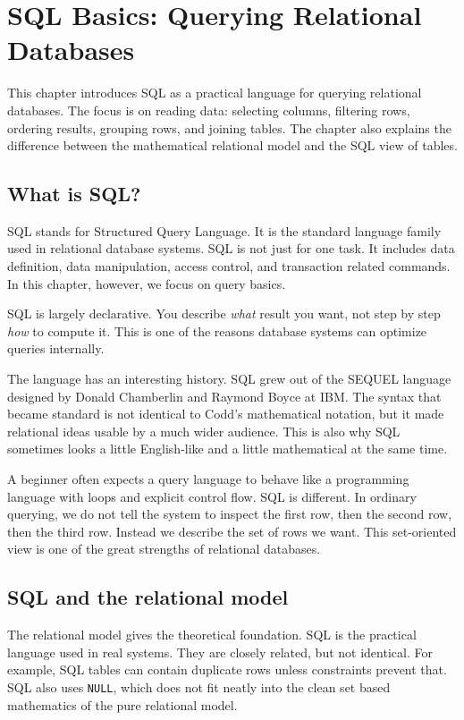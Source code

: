 \documentclass[11pt,a4paper,openany]{book}
\begin{document}
\chapter{SQL Basics: Querying Relational Databases}
\label{ch:sqlbasic}
\begin{guidancebox}
This chapter introduces SQL as a practical language for querying relational databases. The focus is on reading data: selecting columns, filtering rows, ordering results, grouping rows, and joining tables. The chapter also explains the difference between the mathematical relational model and the SQL view of tables.
\end{guidancebox}

\section{What is SQL?}
SQL stands for Structured Query Language. It is the standard language family used in relational database systems. SQL is not just for one task. It includes data definition, data manipulation, access control, and transaction related commands. In this chapter, however, we focus on query basics.

SQL is largely declarative. You describe \emph{what} result you want, not step by step \emph{how} to compute it. This is one of the reasons database systems can optimize queries internally.

The language has an interesting history. SQL grew out of the SEQUEL language designed by Donald Chamberlin and Raymond Boyce at IBM. The syntax that became standard is not identical to Codd's mathematical notation, but it made relational ideas usable by a much wider audience. This is also why SQL sometimes looks a little English-like and a little mathematical at the same time.

A beginner often expects a query language to behave like a programming language with loops and explicit control flow. SQL is different. In ordinary querying, we do not tell the system to inspect the first row, then the second row, then the third row. Instead we describe the set of rows we want. This set-oriented view is one of the great strengths of relational databases.

\section{SQL and the relational model}
The relational model gives the theoretical foundation. SQL is the practical language used in real systems. They are closely related, but not identical. For example, SQL tables can contain duplicate rows unless constraints prevent that. SQL also uses \texttt{NULL}, which does not fit neatly into the clean set based mathematics of the pure relational model.
\end{document}
